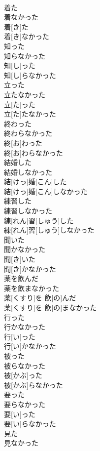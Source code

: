\documentclass[8pt]{extreport}
\begin{document}
\begin{CJK}{UTF8}{min}
\\	着た 
\\	着なかった	
\\	着[き]た 
\\	着[き]なかった
\\	知った 
\\	知らなかった	
\\	知[し]った 
\\	知[し]らなかった
\\	立った 
\\	立たなかった	
\\	立[た]った 
\\	立[た]たなかった
\\	終わった 
\\	終わらなかった	
\\	終[お]わった 
\\	終[お]わらなかった
\\	結婚した 
\\	結婚しなかった	
\\	結[けっ]婚[こん]した 
\\	結[けっ]婚[こん]しなかった
\\	練習した 
\\	練習しなかった	
\\	練[れん]習[しゅう]した 
\\	練[れん]習[しゅう]しなかった
\\	聞いた 
\\	聞かなかった	
\\	聞[き]いた 
\\	聞[き]かなかった
\\	薬を飲んだ 
\\	薬を飲まなかった	
\\	薬[くすり]を 飲[の]んだ 
\\	薬[くすり]を 飲[の]まなかった
\\	行った 
\\	行かなかった	
\\	行[い]った 
\\	行[い]かなかった
\\	被った 
\\	被らなかった	
\\	被[かぶ]った 
\\	被[かぶ]らなかった
\\	要った 
\\	要らなかった	
\\	要[い]った 
\\	要[い]らなかった
\\	見た 
\\	見なかった	

\end{CJK}
\end{document}
